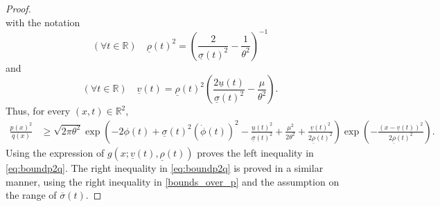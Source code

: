 \documentclass[10pt,a4paper]{amsart}
\begin{document}
\begin{proof}
\begin{equation}
\end{equation}
with the notation
\begin{equation}
(\forall t \in \mathbb{R}) \quad \underline{\rho}(t)^2
=
\left(\frac{2}{\underline{\sigma}(t)^2}-\frac{1}{\theta^2}\right)^{-1}
\end{equation}
and
\begin{equation}
(\forall t \in \mathbb{R}) \quad \underline{v}(t)
=
\underline{\rho}(t)^2
\left(
\frac{2\underline{u}(t)}{\underline{\sigma}(t)^2}
-\frac{\mu}{\theta^2}
\right).
\end{equation}
Thus, for every $(x,t) \in \mathbb{R}^2$,
\begin{align}
\frac{p(x)^2}{q(x)}
&\geq
\sqrt{2\pi \theta^2}
\exp\left(
-2\phi(t)
+\underline{\sigma}(t)^2(\dot{\phi}(t))^2
-\frac{\underline{u}(t)^2}{\underline{\sigma}(t)^2}
+\frac{\mu^2}{2\theta^2}
+\frac{\underline{v}(t)^2}{2\underline{\rho}(t)^2}
\right)
\exp\left(
-\frac{(x-\underline{v}(t))^2}{2\underline{\rho}(t)^2}
\right).
\end{align}
    Using the expression of $g(x;\underline{v}(t),\underline{\rho}(t))$ proves the left inequality in \eqref{eq:boundp2q}. The right inequality in \eqref{eq:boundp2q} is proved in a similar manner, using the right inequality in \eqref{bounds_over_p} and the assumption on the range of $\overline{\sigma}(t)$.




\end{proof}
\end{document}
